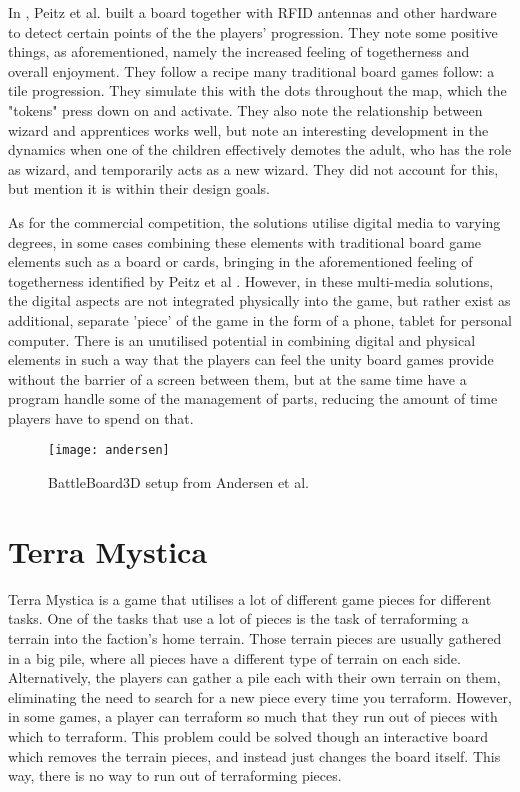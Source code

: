 In \citep{peitzWizards2006}, Peitz et al. built a board together with RFID antennas and other hardware to detect certain points of the the players' progression. They note some positive things, as aforementioned, namely the increased feeling of togetherness and overall enjoyment. They follow a recipe many traditional board games follow: a tile progression. They simulate this with the dots throughout the map, which the "tokens" press down on and activate. They also note the relationship between wizard and apprentices works well, but note an interesting development in the dynamics when one of the children effectively demotes the adult, who has the role as wizard, and temporarily acts as a new wizard. They did not account for this, but mention it is within their design goals.

As for the commercial competition, the solutions utilise digital media to varying degrees, in some cases combining these elements with traditional board game elements such as a board or cards, bringing in the aforementioned feeling of togetherness identified by Peitz et al \citep{peitzWizards2006}. However, in these multi-media solutions, the digital aspects are not integrated physically into the game, but rather exist as additional, separate 'piece' of the game in the form of a phone, tablet for personal computer. There is an unutilised potential in combining digital and physical elements in such a way that the players can feel the unity board games provide without the barrier of a screen between them, but at the same time have a program handle some of the management of parts, reducing the amount of time players have to spend on that.

\begin{figure}[!h]
\centering	
\texttt{[image: andersen]}
\caption{BattleBoard3D setup from Andersen et al.  \citep{andersen_designing_2004}}
\label{fig:andersen}
\end{figure}


\section{Terra Mystica}
Terra Mystica is a game that utilises a lot of different game pieces for different tasks. One of the tasks that use a lot of pieces is the task of terraforming a terrain into the faction's home terrain. Those terrain pieces are usually gathered in a big pile, where all pieces have a different type of terrain on each side. Alternatively, the players can gather a pile each with their own terrain on them, eliminating the need to search for a new piece every time you terraform. However, in some games, a player can terraform so much that they run out of pieces with which to terraform. This problem could be solved though an interactive board which removes the terrain pieces, and instead just changes the board itself. This way, there is no way to run out of terraforming pieces.

